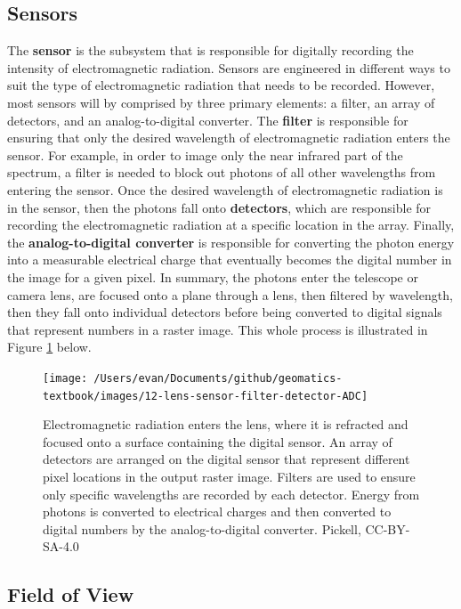 \documentclass[
]{book}
\begin{document}
\hypertarget{sensors}{%
\subsection{Sensors}\label{sensors}}

The \textbf{sensor} is the subsystem that is responsible for digitally recording the intensity of electromagnetic radiation. Sensors are engineered in different ways to suit the type of electromagnetic radiation that needs to be recorded. However, most sensors will by comprised by three primary elements: a filter, an array of detectors, and an analog-to-digital converter. The \textbf{filter} is responsible for ensuring that only the desired wavelength of electromagnetic radiation enters the sensor. For example, in order to image only the near infrared part of the spectrum, a filter is needed to block out photons of all other wavelengths from entering the sensor. Once the desired wavelength of electromagnetic radiation is in the sensor, then the photons fall onto \textbf{detectors}, which are responsible for recording the electromagnetic radiation at a specific location in the array. Finally, the \textbf{analog-to-digital converter} is responsible for converting the photon energy into a measurable electrical charge that eventually becomes the digital number in the image for a given pixel. In summary, the photons enter the telescope or camera lens, are focused onto a plane through a lens, then filtered by wavelength, then they fall onto individual detectors before being converted to digital signals that represent numbers in a raster image. This whole process is illustrated in Figure \ref{fig:12-lens-sensor-filter-detector-ADC} below.

\begin{figure}
\texttt{[image: /Users/evan/Documents/github/geomatics-textbook/images/12-lens-sensor-filter-detector-ADC]} \caption{Electromagnetic radiation enters the lens, where it is refracted and focused onto a surface containing the digital sensor. An array of detectors are arranged on the digital sensor that represent different pixel locations in the output raster image. Filters are used to ensure only specific wavelengths are recorded by each detector. Energy from photons is converted to electrical charges and then converted to digital numbers by the analog-to-digital converter. Pickell, CC-BY-SA-4.0}\label{fig:12-lens-sensor-filter-detector-ADC}
\end{figure}

\hypertarget{field-of-view}{%
\subsection{Field of View}\label{field-of-view}}
\end{document}
